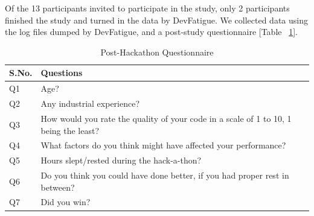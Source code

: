 \documentclass{acm_proc_article-sp}
\begin{document}
Of the 13 participants invited to participate in the study, only 2 participants
finished the study and turned in the data by DevFatigue. We collected data using
the log files dumped by DevFatigue, and a post-study questionnaire [Table
~\ref{table:question}].
	\begin{table}
		\centering
		\caption{Post-Hackathon Questionnaire}
		\begin{tabular}{|p{1cm}|p{3cm}|} \hline
			S.No.&Questions\\ \hline
			Q1 & Age?\\ \hline
			Q2 & Any industrial experience?\\ \hline
			Q3 & How would you rate the quality of your code in a scale of 1 to 10, 1
			being the least? \\ \hline
			Q4 & What factors do you think might have affected your performance? \\
			\hline Q5 & Hours slept/rested during the hack-a-thon? \\
			\hline Q6 & Do you think you could have done better, if you had proper rest
			in between? \\ \hline Q7 & Did you win? \\
			\hline
		\end{tabular}
		\label{table:question}
	\end{table}
	
\end{document}
